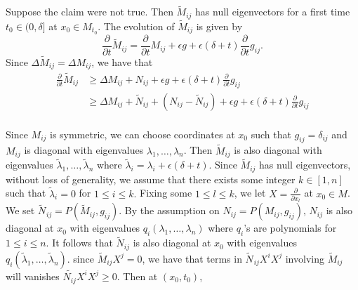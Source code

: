 \documentclass[a4paper]{report}
\theoremstyle{remark}
\begin{document}
	Suppose the claim were not true. Then $\tilde{M}_{ij }^{}$ has null eigenvectors for a first time $t_0 \in (0,\delta ]$ at $x_0 \in M_{t_0}$. 
	The evolution of $\tilde{M}_{ij }$ is given by 
	\[\frac{\partial }{\partial t} \tilde{M}_{ij }^{} = \frac{\partial }{\partial t} M_{ij }^{} + \epsilon g+\epsilon (\delta +t) \frac{\partial }{\partial t}  g_{ij}^{}.\]
	Since $\Delta \tilde{M}_{ij}=\Delta M_{ij}$, we have that 
	\begin{equation*}
	\begin{split}
		\frac{\partial }{\partial t} \tilde{M}_{ij }^{} &\geq \Delta M_{ij }^{} + N_{ij }^{}+ \epsilon g+\epsilon (\delta +t) \frac{\partial }{\partial t}  g_{ij}^{}\\
	&\geq \Delta M_{ij }^{} + \tilde{N}_{ij}+ \left( N_{ij }^{}-\tilde{N}_{ij} \right) + \epsilon g+\epsilon (\delta +t) \frac{\partial }{\partial t}  g_{ij}^{}\\
	\end{split}
	\end{equation*}  
	
	

	Since $M_{ij}$ is symmetric, we can choose coordinates at $x_0$ such that $g_{ij }^{} =\delta _{ij}$ and $M_{ij }$ is diagonal with eigenvalues $\lambda_1,\ldots,\lambda_n $. Then $\tilde{M}_{ij }^{} $ is also diagonal with eigenvalues $\tilde{\lambda}_1,\ldots,\tilde{\lambda }_n$ where $\tilde{\lambda }_i=\lambda _i+\epsilon (\delta+t)$. Since $\tilde{M}_{ij }^{}$ has null eigenvectors, without loss of generality, we assume that there exists some integer $k \in [1,n]$ such that $\tilde{\lambda }_i=0$ for $1 \leq i \leq k.$ Fixing some $1 \leq l \leq k$, we let $X=\frac{\partial }{\partial x_{l}} $ at $x_0 \in M$. We set $\tilde{N^{} }_{ij }=P(\tilde{M}_{ij }^{} , g_{ij }^{} )$. By the assumption on $N_{ij }^{}=P(M_{ij }^{},g_{ij }^{} )$, $N_{ij }^{} $ is also diagonal at $x_0$ with eigenvalues $q_i(\lambda_1,\ldots,\lambda _n)$ where $q_i$'s are polynomials for $1 \leq i \leq n.$ It follows that $\tilde{N}_{ij }^{} $ is also diagonal at $x_0$ with eigenvalues $q_i(\tilde{\lambda}_1,\ldots,\tilde{\lambda} _n)$.	since $\tilde{M}_{ij }^{} X^j=0$, we have that terms in $\tilde{N^{} }_{ij }X^i X^j$ involving $\tilde{M}_{ij}$ will vanishes  $\tilde{N_{ij }^{}} X^i X^j \geq 0$. Then at $(x_0,t_0)$, 
\end{document}
